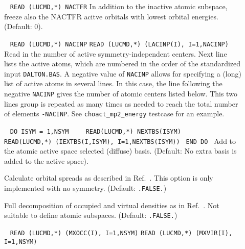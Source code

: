 \begin{description}
\item[]\verb| |\newline
\verb|READ (LUCMD,*) NACTFR|\newline
        In addition to the inactive atomic subspace, freeze also
        the NACTFR acitve orbitals with lowest orbital energies.
        (Default: 0).
%
\item[] \verb| |\newline
\verb|READ (LUCMD,*) NACINP|\newline
\verb|READ (LUCMD,*) (LACINP(I), I=1,NACINP)|\newline
       Read in the number of active symmetry-independent centers. Next
       line lists the active atoms, which are numbered in the order
       of the standardized input \verb|DALTON.BAS|. A
       negative value of \verb|NACINP| allows for specifying a (long)
       list of active atoms in several lines. In this case, the
       line following the negative \verb|NACINP| gives the number of
       atomic centers listed below. This two lines group is repeated
       as many times as needed to reach the total number of elements
       \verb|-NACINP|. See \verb|choact_mp2_energy| testcase for an example.
%
\item[]  \verb| |\newline
\verb|DO ISYM = 1,NSYM |\newline
\verb|   READ(LUCMD,*) NEXTBS(ISYM) |\newline
\verb|   READ(LUCMD,*) (IEXTBS(I,ISYM), I=1,NEXTBS(ISYM)) |\newline
\verb|END DO |\newline
        Add to the atomic active space selected (diffuse) basis. 
        (Default: No extra basis is added to the active space).
%
\item[]
        Calculate orbital spreads as described in 
        Ref.~\cite{ziolkowski2009}. This option is only
        implemented with no symmetry.
        (Default: \verb|.FALSE.|)
%
\item[] 
        Full decomposition of occupied and virtual densities as in 
        Ref.~\cite{aquilante2006}. Not suitable to define atomic
        subspaces. (Default: \verb|.FALSE.|)
%
\item[]  \verb| |\newline
\verb|READ (LUCMD,*) (MXOCC(I), I=1,NSYM)|\newline
\verb|READ (LUCMD,*) (MXVIR(I), I=1,NSYM)|\newline

\end{description}
